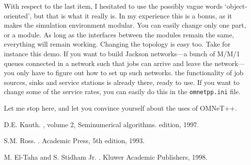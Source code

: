 \documentclass[a4paper]{article}
\begin{document}
With respect to the last item, I hesitated to use the
possibly vague words `object-oriented', but that is what it really is.
In my experience this is a bonus, as it makes the simulation
environment  modular. You can easily change only one part, or a
module. As long as the interfaces between the modules remain the same,
everything will remain working. Changing the topology is easy
too. Take for instance this demo. If you want to build Jackson
networks---a bunch of M/M/1 queues connected in a network such that
jobs can arrive and leave the network---you only have to figure out
how to set up such networks.  the functionality of job sources, sinks
and service stations is already there, ready to use. If you want to
change some of the service rates, you can easily do this in the
\texttt{omnetpp.ini} file.

Let me stop here, and let you convince yourself about the uses of
OMNeT++.

\begin{thebibliography}{Ros93}

D.E. Knuth.
, volume 2, Seminumerical
  algorithms.
 edition, 1997.

S.M. Ross.
.
\newblock Academic Press, 5th edition, 1993.

M. El-Taha and S. Stidham Jr.
.
\newblock Kluwer Academic Publishers, 1998.

\end{thebibliography}

% 
% 
\end{document}
